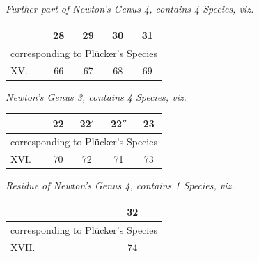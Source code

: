 \documentclass[11pt]{article}
\begin{document}
\medskip
\noindent\emph{Further part of Newton's Genus 4, contains 4 Species, viz.}
\begin{center}\small
\begin{tabular}{|l|c|c|c|c|}\hline
& 28 & 29 & 30 & 31 \\\hline
\multicolumn{5}{|l|}{\quad corresponding to Pl\"ucker's Species}\\\hline
XV. & 66 & 67 & 68 & 69 \\\hline
\end{tabular}
\end{center}

\medskip
\noindent\emph{Newton's Genus 3, contains 4 Species, viz.}
\begin{center}\small
\begin{tabular}{|l|c|c|c|c|}\hline
& 22 & 22$'$ & 22$''$ & 23 \\\hline
\multicolumn{5}{|l|}{\quad corresponding to Pl\"ucker's Species}\\\hline
XVI. & 70 & 72 & 71 & 73 \\\hline
\end{tabular}
\end{center}

\medskip
\noindent\emph{Residue of Newton's Genus 4, contains 1 Species, viz.}
\begin{center}\small
\begin{tabular}{|l|c|}\hline
& 32 \\\hline
\multicolumn{2}{|l|}{\quad corresponding to Pl\"ucker's Species}\\\hline
XVII. & 74 \\\hline
\end{tabular}
\end{center}
\end{document}
